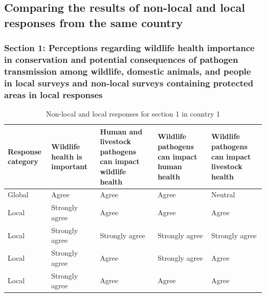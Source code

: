 \documentclass[
  letterpaper,
  DIV=11,
  numbers=noendperiod]{scrartcl}
\begin{document}
\hypertarget{comparing-the-results-of-non-local-and-local-responses-from-the-same-country}{%
\subsection{Comparing the results of non-local and local responses from
the same
country}\label{comparing-the-results-of-non-local-and-local-responses-from-the-same-country}}

\hypertarget{section-1-perceptions-regarding-wildlife-health-importance-in-conservation-and-potential-consequences-of-pathogen-transmission-among-wildlife-domestic-animals-and-people-in-local-surveys-and-non-local-surveys-containing-protected-areas-in-local-responses}{%
\subsubsection{Section 1: Perceptions regarding wildlife health
importance in conservation and potential consequences of pathogen
transmission among wildlife, domestic animals, and people in local
surveys and non-local surveys containing protected areas in local
responses}\label{section-1-perceptions-regarding-wildlife-health-importance-in-conservation-and-potential-consequences-of-pathogen-transmission-among-wildlife-domestic-animals-and-people-in-local-surveys-and-non-local-surveys-containing-protected-areas-in-local-responses}}

\begin{table}[H]

\caption{Non-local and local responses for section 1 in country 1}
\centering
\begin{tabular}[t]{>{\raggedright\arraybackslash}p{2cm}|>{\raggedright\arraybackslash}p{3cm}|>{\raggedright\arraybackslash}p{3cm}|>{\raggedright\arraybackslash}p{3cm}|>{\raggedright\arraybackslash}p{3cm}}
\hline
Response
category & Wildlife health
is important & Human and livestock
pathogens can
impact wildlife
health & Wildlife pathogens can
impact human health & Wildlife pathogens can
impact livestock health\\
\hline
Global & Agree & Agree & Agree & Neutral\\
\hline
Local & Strongly agree & Agree & Agree & \vphantom{1} Agree\\
\hline
Local & Strongly agree & Strongly agree & Strongly agree & Strongly agree\\
\hline
Local & Strongly agree & Agree & Strongly agree & Agree\\
\hline
Local & Strongly agree & Agree & Agree & Agree\\
\hline
\end{tabular}
\end{table}
\end{document}
